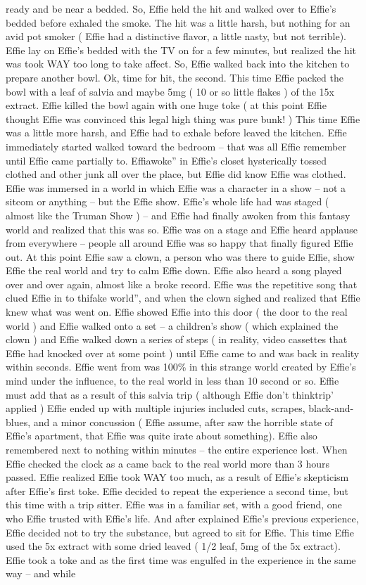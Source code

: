 \documentclass[12pt]{book}
\begin{document}
ready and be near a bedded. So, Effie held the hit and walked over to Effie's bedded before exhaled the smoke. The hit was a little harsh, but nothing for an avid pot smoker ( Effie had a distinctive flavor, a little nasty, but not terrible). Effie lay on Effie's bedded with the TV on for a few minutes, but realized the hit was took WAY too long to take affect. So, Effie walked back into the kitchen to prepare another bowl. Ok, time for hit, the second. This time Effie packed the bowl with a leaf of salvia and maybe 5mg ( 10 or so little flakes ) of the 15x extract. Effie killed the bowl again with one huge toke ( at this point Effie thought Effie was convinced this legal high thing was pure bunk! ) This time Effie was a little more harsh, and Effie had to exhale before leaved the kitchen. Effie immediately started walked toward the bedroom -- that was all Effie remember until Effie came partially to. Effiawoke'' in Effie's closet hysterically tossed clothed and other junk all over the place, but Effie did know Effie was clothed. Effie was immersed in a world in which Effie was a character in a show -- not a sitcom or anything -- but the Effie show. Effie's whole life had was staged ( almost like the Truman Show ) -- and Effie had finally awoken from this fantasy world and realized that this was so. Effie was on a stage and Effie heard applause from everywhere -- people all around Effie was so happy that finally figured Effie out. At this point Effie saw a clown, a person who was there to guide Effie, show Effie the real world and try to calm Effie down. Effie also heard a song played over and over again, almost like a broke record. Effie was the repetitive song that clued Effie in to thifake world'', and when the clown sighed and realized that Effie knew what was went on. Effie showed Effie into this door ( the door to the real world ) and Effie walked onto a set -- a children's show ( which explained the clown ) and Effie walked down a series of steps ( in reality, video cassettes that Effie had knocked over at some point ) until Effie came to and was back in reality within seconds. Effie went from was 100\% in this strange world created by Effie's mind under the influence, to the real world in less than 10 second or so. Effie must add that as a result of this salvia trip ( although Effie don't thinktrip' applied ) Effie ended up with multiple injuries included cuts, scrapes, black-and-blues, and a minor concussion ( Effie assume, after saw the horrible state of Effie's apartment, that Effie was quite irate about something). Effie also remembered next to nothing within minutes -- the entire experience lost. When Effie checked the clock as a came back to the real world more than 3 hours passed. Effie realized Effie took WAY too much, as a result of Effie's skepticism after Effie's first toke. Effie decided to repeat the experience a second time, but this time with a trip sitter. Effie was in a familiar set, with a good friend, one who Effie trusted with Effie's life. And after explained Effie's previous experience, Effie decided not to try the substance, but agreed to sit for Effie. This time Effie used the 5x extract with some dried leaved ( 1/2 leaf, 5mg of the 5x extract). Effie took a toke and as the first time was engulfed in the experience in the same way -- and while 
\end{document}
